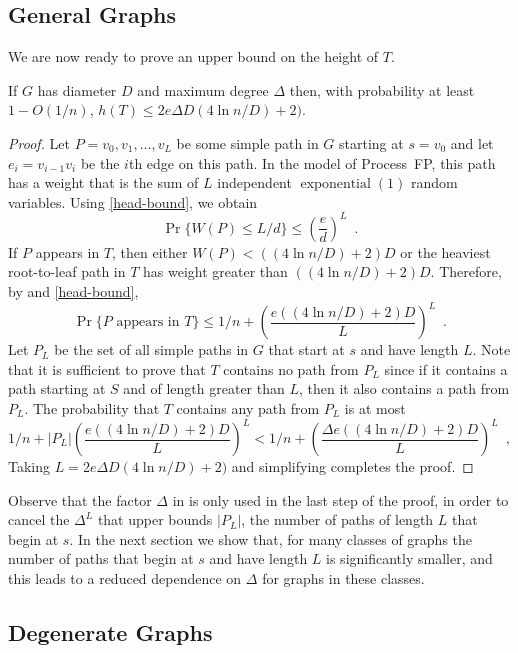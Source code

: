 \documentclass[lotsofwhite]{patmorin}
\DeclareMathOperator{\exponential}{exponential}
\begin{document}
\subsection{General Graphs}

We are now ready to prove an upper bound on the height of $T$.

\begin{thm}
  If $G$ has diameter $D$ and maximum degree $\Delta$ then, with
  probability at least $1-O(1/n)$, $h(T)\le 2e\Delta D(4\ln n/D)+2)$.
\end{thm}

\begin{proof}
  Let $P=v_0,v_1,\ldots,v_L$ be some simple path in $G$ starting at
  $s=v_0$ and let $e_i=v_{i-1}v_i$ be the $i$th edge on this path.
  In the model of Process~FP, this path has a weight that is the 
  sum of $L$ independent $\exponential(1)$ random variables.
  Using \eqref{head-bound}, we obtain
  \[
      \Pr\{W(P) \le L/d\} \le \left(\frac{e}{d}\right)^L \enspace .
  \]
  If $P$ appears in $T$, then either $W(P) < ((4\ln n/D)+2)D$ or the
  heaviest root-to-leaf path in $T$ has weight greater than $((4\ln
  n/D)+2)D$.  Therefore, by  and \eqref{head-bound},
  \[
      \Pr\{\text{$P$ appears in $T$}\} \le 1/n 
        + \left(\frac{e((4\ln n/D)+2)D}{L}\right)^L \enspace .
  \]
  Let $P_L$ be the set of all simple paths in $G$ that start at $s$ and
  have length $L$.  Note that it is sufficient to prove that $T$ contains
  no path from $P_L$ since if it contains a path starting at $S$ and of 
  length greater than $L$, then it also contains a path from $P_L$.  
  The probability that $T$ contains any path from $P_L$
  is at most
  \[
      1/n + |P_L|\left(\frac{e((4\ln n/D)+2)D}{L}\right)^L 
      < 1/n + \left(\frac{\Delta e((4\ln n/D)+2)D}{L}\right)^L \enspace ,
  \]
  Taking $L=2e\Delta D (4\ln n/D)+2)$ and simplifying completes the proof.
\end{proof}

Observe that the factor $\Delta$ in  is only
used in the last step of the proof, in order to cancel the $\Delta^L$
that upper bounds $|P_L|$, the number of paths of length $L$ that begin
at $s$.  In the next section we show that, for many classes of graphs the
number of paths that begin at $s$ and have length $L$ is significantly
smaller, and this leads to a reduced dependence on $\Delta$ for graphs
in these classes.

\subsection{Degenerate Graphs}
\end{document}
